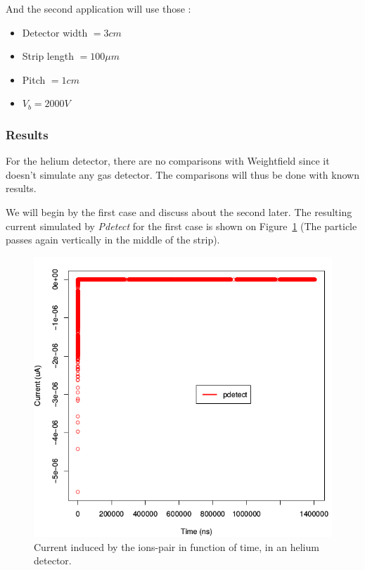 \documentclass[11pt]{article}
\begin{document}
			And the second application will use those :

			\begin{itemize}

				\item Detector width $= 3 cm$
				\item Strip length $= 100 \mu m$
				\item Pitch $= 1 cm$
				\item $V_b = 2000 V$

			\end{itemize}

		\subsubsection*{Results}

			For the helium detector, there are no comparisons with Weightfield since it doesn't simulate
			any gas detector. The comparisons will thus be done with known results.

			We will begin by the first case and discuss about the second later.
			The resulting current simulated by \textit{Pdetect} for the first case is shown on 
			Figure~\ref{fig:helium1_unprecise} (The particle passes again vertically in the middle of
			the strip).

			\begin{figure}[H]
			  \center
			  \includegraphics[scale=0.5]{images/applications/helium1_unprecise.png}
			  \caption{Current induced by the ions-pair in function of time, in an helium detector.}
			  \label{fig:helium1_unprecise}
			\end{figure}
\end{document}
